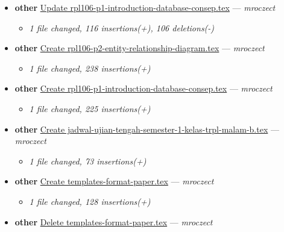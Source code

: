 \begin{itemize}[leftmargin=1.5em]
  \begin{itemize}[leftmargin=1.5em]
    \item \small\textit{1 file changed, 427 insertions(+)}
  \end{itemize}
  \item \textbf{other} \href{https://github.com/mroczect/mroczect.github.io/commit/af48a36fe39b929485133e756712c88bae18d06e}{Update rpl106-p1-introduction-database-consep.tex} --- \textit{mroczect}
  \begin{itemize}[leftmargin=1.5em]
    \item \small\textit{1 file changed, 116 insertions(+), 106 deletions(-)}
  \end{itemize}
  \item \textbf{other} \href{https://github.com/mroczect/mroczect.github.io/commit/401a42351568f2605747439b162bfbf30adf12af}{Create rpl106-p2-entity-relationship-diagram.tex} --- \textit{mroczect}
  \begin{itemize}[leftmargin=1.5em]
    \item \small\textit{1 file changed, 238 insertions(+)}
  \end{itemize}
  \item \textbf{other} \href{https://github.com/mroczect/mroczect.github.io/commit/07a808cc0e59ddf3e668c2326a779e8692701e29}{Create rpl106-p1-introduction-database-consep.tex} --- \textit{mroczect}
  \begin{itemize}[leftmargin=1.5em]
    \item \small\textit{1 file changed, 225 insertions(+)}
  \end{itemize}
  \item \textbf{other} \href{https://github.com/mroczect/mroczect.github.io/commit/68b3c7cbb0b35f079c22c5874603a1fe442b9225}{Create jadwal-ujian-tengah-semester-1-kelas-trpl-malam-b.tex} --- \textit{mroczect}
  \begin{itemize}[leftmargin=1.5em]
    \item \small\textit{1 file changed, 73 insertions(+)}
  \end{itemize}
  \item \textbf{other} \href{https://github.com/mroczect/mroczect.github.io/commit/969a3988ec4b8124cb1677256a181b92fdda0fb3}{Create templates-format-paper.tex} --- \textit{mroczect}
  \begin{itemize}[leftmargin=1.5em]
    \item \small\textit{1 file changed, 128 insertions(+)}
  \end{itemize}
  \item \textbf{other} \href{https://github.com/mroczect/mroczect.github.io/commit/9898d4f15ec884ad60e3510d86b1143ef5ba5615}{Delete templates-format-paper.tex} --- \textit{mroczect}

\end{itemize}
